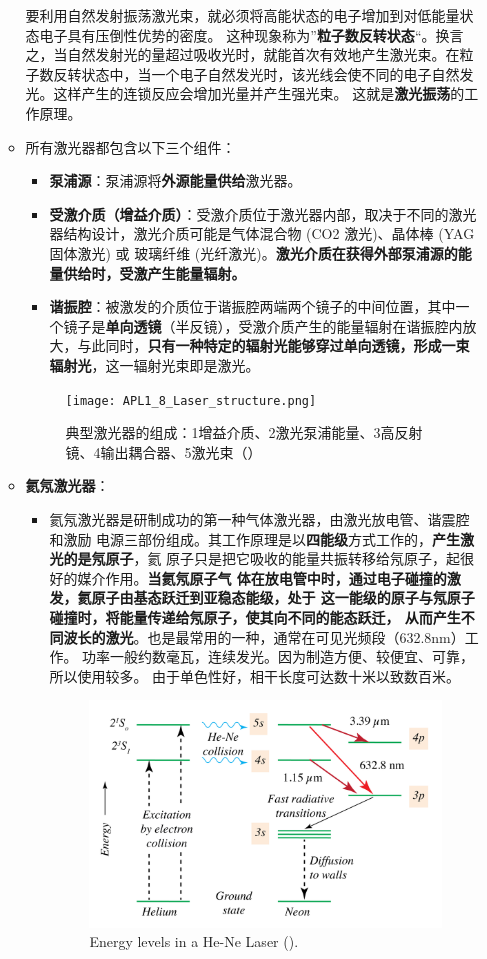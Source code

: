 \begin{enumerate}
\begin{itemize}
		要利用自然发射振荡激光束，就必须将高能状态的电子增加到对低能量状态电子具有压倒性优势的密度。 这种现象称为”\textbf{粒子数反转状态}“。换言之，当自然发射光的量超过吸收光时，就能首次有效地产生激光束。在粒子数反转状态中，当一个电子自然发光时，该光线会使不同的电子自然发光。这样产生的连锁反应会增加光量并产生强光束。 这就是\textbf{激光振荡}的工作原理。
		
		\item 所有激光器都包含以下三个组件：
		\begin{itemize}
			\item \textbf{泵浦源}：泵浦源将\textbf{外源能量供给}激光器。
			\item \textbf{受激介质（增益介质）}：受激介质位于激光器内部，取决于不同的激光器结构设计，激光介质可能是气体混合物 (CO2 激光)、晶体棒 (YAG 固体激光) 或 玻璃纤维 (光纤激光)。\textbf{激光介质在获得外部泵浦源的能量供给时，受激产生能量辐射。}
			\item \textbf{谐振腔}：被激发的介质位于谐振腔两端两个镜子的中间位置，其中一个镜子是\textbf{单向透镜}（半反镜），受激介质产生的能量辐射在谐振腔内放大，与此同时，\textbf{只有一种特定的辐射光能够穿过单向透镜，形成一束辐射光}，这一辐射光束即是激光。
		\end{itemize}
		
		\begin{figure}[h]
			\centering
			\texttt{[image: APL1\_8\_Laser\_structure.png]}
			\caption{典型激光器的组成：1增益介质、2激光泵浦能量、3高反射镜、4输出耦合器、5激光束（\cite{a}）}
			\label{fig:apl18laserstructure}
		\end{figure}
		
		\item \textbf{氦氖激光器}：
		\begin{itemize}
			\item 氦氖激光器是研制成功的第一种气体激光器，由激光放电管、谐震腔和激励
			电源三部份组成。其工作原理是以\textbf{四能级}方式工作的，\textbf{产生激光的是氖原子}，氦
			原子只是把它吸收的能量共振转移给氖原子，起很好的媒介作用。\textbf{当氦氖原子气
			体在放电管中时，通过电子碰撞的激发，氦原子由基态跃迁到亚稳态能级，处于
			这一能级的原子与氖原子碰撞时，将能量传递给氖原子，使其向不同的能态跃迁，
			从而产生不同波长的激光}。也是最常用的一种，通常在可见光频段（632.8nm）工作。
			功率一般约数毫瓦，连续发光。因为制造方便、较便宜、可靠，所以使用较多。
			由于单色性好，相干长度可达数十米以致数百米。
			\begin{figure}[h]
				\centering
				\includegraphics[width=0.6\linewidth]{images/APL1_8_HeNe_Laser_Levels}
				\caption{Energy levels in a He-Ne Laser (\cite{a}).}
				\label{fig:apl18henelaserlevels}
			\end{figure}
			

\end{itemize}
\end{itemize}
\end{enumerate}
